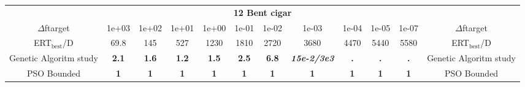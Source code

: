 \begin{tabular}{cccccccccccc}
 & \multicolumn{10}{c}{{\normalsize \textbf{12 Bent cigar}}}\\
$\Delta$ftarget& 1e+03& 1e+02& 1e+01& 1e+00& 1e-01& 1e-02& 1e-03& 1e-04& 1e-05& 1e-07 & $\Delta$ftarget \\
ERT$_{\textrm{best}}$/D& 69.8& 145& 527& 1230& 1810& 2720& 3680& 4470& 5440& 5580 & ERT$_{\textrm{best}}$/D \\
\hline
Genetic Algoritm study & \textbf{2.1} & \textbf{1.6} & \textbf{1.2} & \textbf{1.5} & \textbf{2.5} & \textbf{6.8} & \textbf{\textit{15e-2}\textit{/3e3}} & \textbf{.} & \textbf{.} & \textbf{.} & Genetic Algoritm study \cite{add_an_entry_for_Genetic Algoritm study_in_bbob.bib}\\
PSO Bounded & \textbf{1} & \textbf{1} & \textbf{1} & \textbf{1} & \textbf{1} & \textbf{1} & \textbf{1} & \textbf{1} & \textbf{1} & \textbf{1} & PSO Bounded \cite{add_an_entry_for_PSO Bounded_in_bbob.bib}
\end{tabular}
